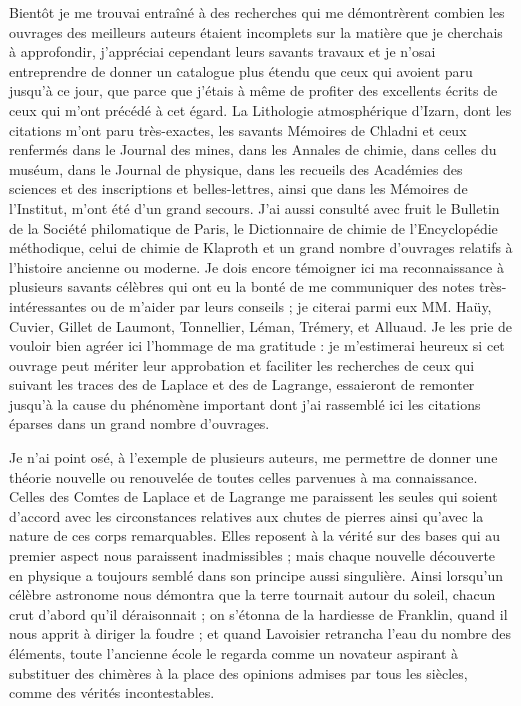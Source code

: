 \documentclass[a4paper, 12pt, oneside, french]{article}
\begin{document}
Bientôt je me trouvai entraîné à des recherches qui me démontrèrent combien les ouvrages des meilleurs auteurs étaient incomplets sur la matière que je cherchais à approfondir, j'appréciai cependant leurs savants travaux et je n'osai entreprendre de donner un catalogue plus étendu que ceux qui avoient paru jusqu'à ce jour, que parce que j'étais à même de profiter des excellents écrits de ceux qui m'ont précédé à cet égard. La Lithologie atmosphérique d'Izarn, dont les citations m'ont paru très-exactes, les savants Mémoires de Chladni et ceux renfermés dans le Journal des mines, dans les Annales de chimie, dans celles du muséum, dans le Journal de physique, dans les recueils des Académies des sciences et des inscriptions et belles-lettres, ainsi que dans les Mémoires de l'Institut, m'ont été d'un grand secours. J'ai aussi consulté avec fruit le Bulletin de la Société philomatique de Paris, le Dictionnaire de chimie de l’Encyclopédie méthodique, celui de chimie de Klaproth et un grand nombre d'ouvrages relatifs à l'histoire ancienne ou moderne. Je dois encore témoigner ici ma reconnaissance à plusieurs savants célèbres qui ont eu la bonté de me communiquer des notes très-intéressantes ou de m'aider par leurs conseils ; je citerai parmi eux MM. Haüy, Cuvier, Gillet de Laumont, Tonnellier, Léman, Trémery, et Alluaud. Je les prie de vouloir bien agréer ici l'hommage de ma gratitude : je m'estimerai heureux si cet ouvrage peut mériter leur approbation et faciliter les recherches de ceux qui suivant les traces des de Laplace et des de Lagrange, essaieront de remonter jusqu'à la cause du phénomène important dont j'ai rassemblé ici les citations éparses dans un grand nombre d'ouvrages.

Je n'ai point osé, à l'exemple de plusieurs auteurs, me permettre de donner une théorie nouvelle ou renouvelée de toutes celles parvenues à ma connaissance. Celles des Comtes de Laplace et de Lagrange me paraissent les seules qui soient d'accord avec les circonstances relatives aux chutes de pierres ainsi qu'avec la nature de ces corps remarquables. Elles reposent à la vérité sur des bases qui au premier aspect nous paraissent inadmissibles ; mais chaque nouvelle découverte en physique a toujours semblé dans son principe aussi singulière. Ainsi lorsqu'un célèbre astronome nous démontra que la terre tournait autour du soleil, chacun crut d'abord qu'il déraisonnait ; on s'étonna de la hardiesse de Franklin, quand il nous apprit à diriger la foudre ; et quand Lavoisier retrancha l'eau du nombre des éléments, toute l'ancienne école le regarda comme un novateur aspirant à substituer des chimères à la place des opinions admises par tous les siècles, comme des vérités incontestables.
\end{document}
